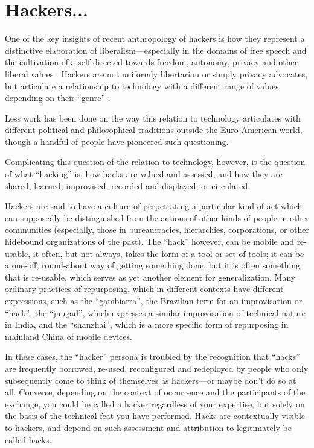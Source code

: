 \documentclass[10pt,letter,oneside]{scrartcl}
\begin{document}
\section*{Hackers...}

One of the key insights of recent anthropology of hackers is how they represent
a distinctive elaboration of liberalism---especially in the domains of free
speech and the cultivation of a self directed towards freedom, autonomy, privacy
and other liberal values \parencite{coleman_coding_2012,kelty_two_2008,coleman_hacker_2014}. Hackers are
not uniformly libertarian or simply privacy advocates, but articulate a
relationship to technology with a different range of values depending on their
``genre'' \parencite{coleman_hacker_2008}.

Less work has been done on the way this relation to technology articulates with
different political and philosophical traditions outside the Euro-American
world, though a handful of people have pioneered such questioning.
 

Complicating this question of the relation to technology, however, is the
question of what ``hacking'' is, how hacks are valued and assessed, and how they
are shared, learned, improvised, recorded and displayed, or circulated. 

Hackers are said to have a culture of perpetrating a particular kind of act
which can supposedly be distinguished from the actions of other kinds of people
in other communities (especially, those in bureaucracies, hierarchies,
corporations, or other hidebound organizations of the past).  The ``hack''
however, can be mobile and re-usable, it often, but not always, takes the form
of a tool or set of tools; it can be a one-off, round-about way of getting
something done, but it is often something that is re-usable, which serves as yet
another element for generalization.  Many ordinary practices of repurposing,
which in different contexts have different expressions, such as the
``gambiarra'', the Brazilian term for an improvisation or ``hack'', the
``juugad'', which expresses a similar improvisation of technical nature in
India, and the ``shanzhai'', which is a more specific form of repurposing in
mainland China of mobile devices.


In these cases, the ``hacker'' persona is troubled by the recognition that
``hacks'' are frequently borrowed, re-used, reconfigured and redeployed by
people who only subsequently come to think of themselves as hackers---or maybe
don’t do so at all.  Converse, depending on the context of occurrence and the
participants of the exchange, you could be called a hacker regardless of your
expertise, but solely on the basis of the technical feat you have performed.
Hacks are contextually visible to hackers, and depend on such assessment and
attribution to legitimately be called hacks.
\end{document}
